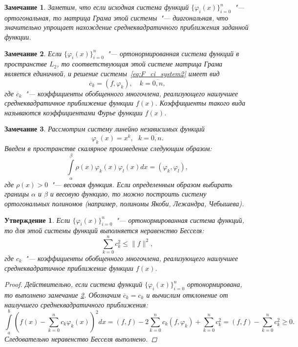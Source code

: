 \documentclass[11pt,a4paper,twoside,listtotoc,bibtotoc]{report}
\numberwithin{equation}{section}
\newtheorem*{statement}{Утверждение}
\theoremstyle{definition}
\theoremstyle{plain}
\newtheorem{note}{Замечание}[section]
\begin{document}
%
%
\begin{note}
%
Заметим, что если исходная система функций $\{\varphi_i(x)\}_{i=0}^n$~"---
ортогональная, то матрица Грама этой системы~"--- диагональная, что значительно
упрощает нахождение среднеквадратичного приближения заданной функции.
%
\end{note}
%
%
\begin{note}
\label{note1}
%
    Если $\{\varphi_i(x)\}_{i=0}^n$~"--- ортонормированная система функций
    в пространстве $L_2$, то соответствующая этой системе матрица Грама
    является единичной, и решение системы~\eqref{eq:F_ci_system2} имеет вид
    \begin{equation}
        \label{coeffs_dot_product}
        \overline{c}_k = (f, \varphi_k), \quad k = \overline{0,n},
    \end{equation}
    где $\overline{c}_k$~"--- коэффициенты обобщенного многочлена, реализующего
    наилучшее среднеквадратичное приближение функции $f(x)$. Коэффициенты
    такого вида называются коэффициентами Фурье функции $f(x)$.
%
\end{note}
%
%
\begin{note}
%
Рассмотрим систему линейно независимых функций
$$
    \varphi _k(x) = x^k,~~~k=\overline{0,n}.
$$
Введем в пространстве скалярное произведение следующим образом:
$$
    \int \limits_{\alpha}^{\beta} \rho(x) \varphi_k(x) \varphi_l(x) dx =
    (\varphi_k, \varphi_l),
$$
где $\rho(x) > 0$~"--- весовая функция. Если определенным образом выбирать
границы $\alpha$ и $\beta$ и весовую функцию, то можно построить систему
ортогональных полиномов (например, полиномы Якоби, Лежандра, Чебышева).
%
\end{note}
%
%
\begin{statement}
%
    Если $\{\varphi_i(x)\}_{i=0}^n$~"--- ортонормированная система функций,
    то для этой системы функций выполняется неравенство Бесселя:
    $$
        \sum_{k=0}^n c_k^2 \leqslant \|f\|^2,
    $$
    где $c_k$~"--- коэффициенты обобщенного многочлена, реализующего
    наилучшее среднеквадратичное приближение функции $f(x)$.
    \begin{proof}
    Действительно, если система функций $\{\varphi_i(x)\}_{i=0}^n$ ортонормирована,
    то выполнено замечание \ref{note1}. Обозначим $\overline{c}_k = c_k$ и
    вычислим отклонение от наилучшего среднеквадратичного приближения:
    $$
         \int\limits_a^b (f(x) - \sum_{k=0}^n c_k \varphi_k(x))^2 dx = (f,f)
         - 2\sum_{k=0}^n c_k(f, \varphi_k) + \sum_{k=0}^n c_k^2 = (f,f) -
         \sum_{k=0}^n c_k^2 \geqslant 0.
    $$
    Следовательно неравенство Бесселя выполнено.
    \end{proof}
%
\end{statement}
\end{document}
